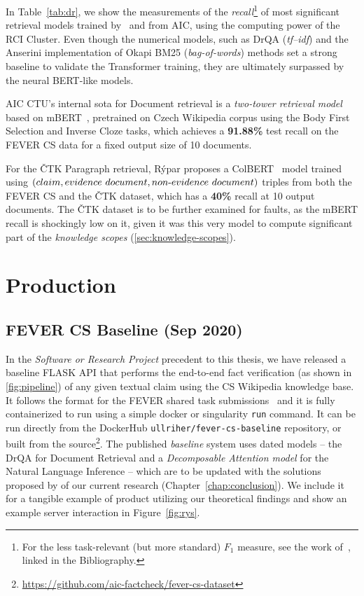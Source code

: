 In Table~\ref{tab:dr}, we show the measurements of the \textit{recall}\footnote{For the less task-relevant (but more standard) $F_1$ measure, see the work of~\cite{rypar}, linked in the Bibliography.} of most significant retrieval models trained by~\cite{rypar} and \cite{michal} from \textsf{AIC}, using the computing power of the \textsf{RCI Cluster}. Even though the numerical models, such as \textsf{DrQA} (\textit{tf--idf}) and the \textsf{Anserini} implementation of \textsf{Okapi BM25} (\textit{bag-of-words})  methods set a strong baseline to validate the Transformer training, they are ultimately surpassed by the neural \textsf{BERT}-like models.


\textsf{AIC CTU}'s internal sota for Document retrieval is a \textit{two-tower retrieval model}~\cite{twotower} based on \textsf{mBERT}~\cite{bert}, pretrained on Czech \textsf{Wikipedia} corpus using the Body First Selection and Inverse Cloze tasks, which achieves a \textbf{91.88\%} test recall on the \textsf{FEVER CS} data for a fixed output size of 10 documents.

For the \textsf{ČTK Paragraph} retrieval, Rýpar proposes a \textsf{ColBERT}~\cite{colbert} model trained using $(claim,evidence~document,non{\text -}evidence~document)$ triples from both the \textsf{FEVER CS} and the \textsf{ČTK} dataset, which has a \textbf{40\%} recall at 10 output documents. The \textsf{ČTK} dataset is to be further examined for faults, as the \textsf{mBERT} recall is shockingly low on it, given it was this very model to compute significant part of the \textit{knowledge scopes} (\ref{sec:knowledge-scopes}).

\section{Production}
\subsection[FEVER CS Baseline]{FEVER CS Baseline (Sep 2020)}

In the \textit{Software or Research Project} precedent to this thesis, we have released a baseline \textsf{FLASK} \textsf{API} that performs the end-to-end fact verification (as shown in \ref{fig:pipeline}) of any given textual claim using the \textsf{CS Wikipedia} knowledge base. It follows the format for the \textsf{FEVER} shared task submissions~\cite{fever1} and it is fully containerized to run using a simple \textsf{docker} or \textsf{singularity} \texttt{run} command. It can be run directly from the \textsf{DockerHub}  \texttt{ullriher/fever-cs-baseline} repository, or built from the source\footnote{\url{https://github.com/aic-factcheck/fever-cs-dataset}}. The published \textit{baseline} system uses dated models -- the \textsf{DrQA} for Document Retrieval and a \textit{Decomposable Attention model} for the Natural Language Inference -- which are to be updated with the solutions proposed by of our current research (Chapter~\ref{chap:conclusion}). We include it for a tangible example of product utilizing our theoretical findings and show an example server interaction in Figure~\ref{fig:rys}.

